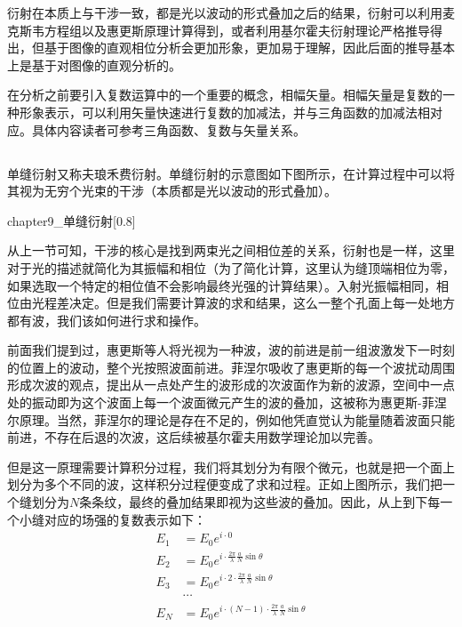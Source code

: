 衍射在本质上与干涉一致，都是光以波动的形式叠加之后的结果，衍射可以利用麦克斯韦方程组以及惠更斯原理计算得到，或者利用基尔霍夫衍射理论严格推导得出，但基于图像的直观相位分析会更加形象，更加易于理解，因此后面的推导基本上是基于对图像的直观分析的。

在分析之前要引入复数运算中的一个重要的概念，相幅矢量。相幅矢量是复数的一种形象表示，可以利用矢量快速进行复数的加减法，并与三角函数的加减法相对应。具体内容读者可参考三角函数、复数与矢量关系。

\subsection[单缝夫琅禾费衍射]{}
单缝衍射又称夫琅禾费衍射。单缝衍射的示意图如下图所示，在计算过程中可以将其视为无穷个光束的干涉（本质都是光以波动的形式叠加）。
\begin{singlefigure}[单缝衍射]{chapter9_单缝衍射}[0.8]
\end{singlefigure}

从上一节可知，干涉的核心是找到两束光之间相位差的关系，衍射也是一样，这里对于光的描述就简化为其振幅和相位（为了简化计算，这里认为缝顶端相位为零，如果选取一个特定的相位值不会影响最终光强的计算结果）。入射光振幅相同，相位由光程差决定。但是我们需要计算波的求和结果，这么一整个孔面上每一处地方都有波，我们该如何进行求和操作。

前面我们提到过，惠更斯等人将光视为一种波，波的前进是前一组波激发下一时刻的位置上的波动，整个光按照波面前进。菲涅尔吸收了惠更斯的每一个波扰动周围形成次波的观点，提出从一点处产生的波形成的次波面作为新的波源，空间中一点处的振动即为这个波面上每一个波面微元产生的波的叠加，这被称为惠更斯-菲涅尔原理。当然，菲涅尔的理论是存在不足的，例如他凭直觉认为能量随着波面只能前进，不存在后退的次波，这后续被基尔霍夫用数学理论加以完善。

但是这一原理需要计算积分过程，我们将其划分为有限个微元，也就是把一个面上划分为多个不同的波，这样积分过程便变成了求和过程。正如上图所示，我们把一个缝划分为$N$条条纹，最终的叠加结果即视为这些波的叠加。因此，从上到下每一个小缝对应的场强的复数表示如下：
\begin{align*}
    E_1 &= E_0 e^{i\cdot 0}\\
    E_2 &= E_0 e^{i\cdot \frac{2\pi}{\lambda}\frac{a}{N}\sin \theta}\\
    E_3 &= E_0 e^{i\cdot 2\cdot \frac{2\pi}{\lambda}\frac{a}{N}\sin \theta}\\
    &\cdots\\
    E_N &= E_0 e^{i\cdot (N-1)\cdot \frac{2\pi}{\lambda}\frac{a}{N}\sin \theta}
\end{align*}

